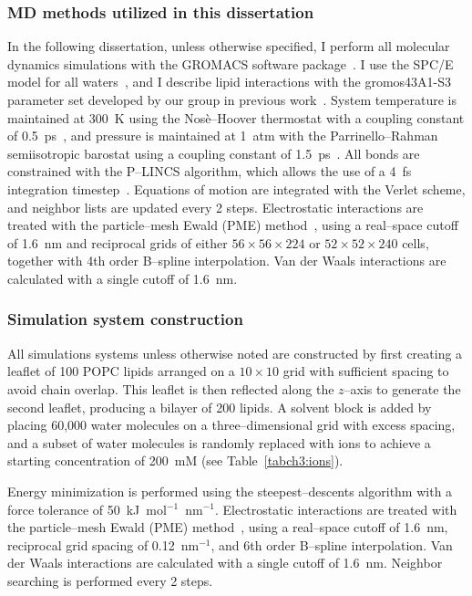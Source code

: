 \subsubsection{MD methods utilized in this dissertation}
In the following dissertation, unless otherwise specified, I perform all molecular dynamics simulations with the GROMACS software 
package~\cite{abraham:2015,pall:2014,van:2005,lindahl:2001,berendsen:1995,gromacs}.
I use the SPC/E model for all waters~\cite{spce}, and I describe lipid interactions
with the gromos43A1-S3 parameter set developed by our group in previous work~\cite{chiu:2009}.
System temperature is maintained at 300~K using the Nos\`e--Hoover thermostat
with a coupling constant of 0.5~ps~\cite{nose:1983}, and pressure is maintained
at 1~atm with the Parrinello--Rahman semiisotropic barostat using a coupling constant of 1.5~ps~\cite{parrinello:1981}.
All bonds are constrained with the P--LINCS algorithm, which allows the use of a 4~fs integration timestep~\cite{lincs}.
Equations of motion are integrated with the Verlet scheme, and neighbor lists are updated every 2 steps.
Electrostatic interactions are treated with the particle--mesh Ewald (PME) method~\cite{essmann:1995},
using a real--space cutoff of 1.6~nm and reciprocal grids of either
$56 \times 56 \times 224$ or $52 \times 52 \times 240$ cells,
together with 4th order B--spline interpolation.
Van der Waals interactions are calculated with a single cutoff of 1.6~nm.
\subsubsection{Simulation system construction}
All simulations systems unless otherwise noted are constructed by first creating a leaflet of 100 POPC lipids arranged
on a $10 \times 10$ grid with sufficient spacing to avoid chain overlap.
This leaflet is then reflected along the $z$--axis to generate the second
leaflet, producing a bilayer of 200 lipids. A solvent block is added by
placing 60,000 water molecules on a three--dimensional grid with excess spacing,
and a subset of water molecules is randomly replaced with ions to achieve a
starting concentration of 200~mM (see Table~\ref{tabch3:ions}).

Energy minimization is performed using the steepest--descents algorithm with a
force tolerance of 50~kJ~mol$^{-1}$~nm$^{-1}$. Electrostatic interactions are
treated with the particle--mesh Ewald (PME) method~\cite{essmann:1995}, using a
real--space cutoff of 1.6~nm, reciprocal grid spacing of 0.12~nm$^{-1}$, and
6th order B--spline interpolation. Van der Waals interactions are calculated
with a single cutoff of 1.6~nm. Neighbor searching is performed every 2 steps.

